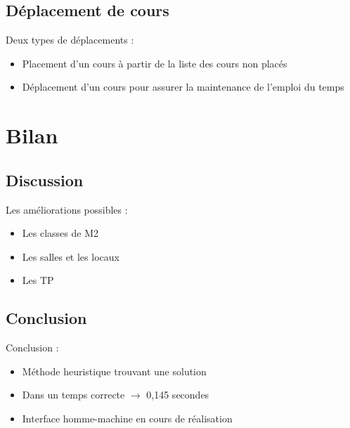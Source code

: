\documentclass{beamer}
\begin{document}
\subsection{Déplacement de cours}
\begin{frame}
Deux types de déplacements :
\begin{itemize}
\item Placement d'un cours à partir de la liste des cours non placés
\item Déplacement d'un cours pour assurer la maintenance de l'emploi du temps
\end{itemize}
\end{frame}

\section{Bilan}
\subsection{Discussion}
\begin{frame}
Les améliorations possibles : 
\begin{itemize}
\item Les classes de M2
\item Les salles et les locaux
\item Les TP
\end{itemize}
\end{frame}

\subsection{Conclusion}
\begin{frame}
Conclusion :
\begin{itemize}
\item Méthode heuristique trouvant une solution\\
\item Dans un temps correcte $\rightarrow$ 0,145 secondes\\
\item Interface homme-machine en cours de réalisation
\end{itemize}
\end{frame}
\end{document}
